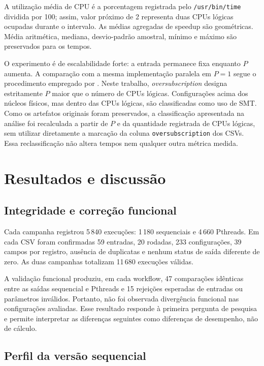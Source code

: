 \documentclass[12pt,a4paper]{article}
\begin{document}
A utilização média de CPU é a porcentagem registrada pelo
\texttt{/usr/bin/time} dividida por 100; assim, valor próximo de 2 representa
duas CPUs lógicas ocupadas durante o intervalo. As médias agregadas de speedup
são geométricas. Média aritmética, mediana, desvio-padrão amostral, mínimo e
máximo são preservados para os tempos.

O experimento é de escalabilidade forte: a entrada permanece fixa enquanto
$P$ aumenta. A comparação com a mesma implementação paralela em $P=1$ segue o
procedimento empregado por \textcite{millan2015performance}. Neste trabalho,
\textit{oversubscription} designa estritamente $P$ maior que o número de CPUs
lógicas. Configurações acima dos núcleos físicos, mas dentro das CPUs lógicas,
são classificadas como uso de SMT. Como os artefatos originais foram preservados,
a classificação apresentada na análise foi recalculada a partir de $P$ e da
quantidade registrada de CPUs lógicas, sem utilizar diretamente a marcação da
coluna \texttt{oversubscription} dos CSVs. Essa reclassificação não altera
tempos nem qualquer outra métrica medida.

\section{Resultados e discussão}

\subsection{Integridade e correção funcional}

Cada campanha registrou 5\,840 execuções: 1\,180 sequenciais e 4\,660 Pthreads. Em
cada CSV foram confirmadas 59 entradas, 20 rodadas, 233 configurações, 39 campos
por registro, ausência de duplicatas e nenhum status de saída diferente de
zero. As duas campanhas totalizam 11\,680 execuções válidas.

A validação funcional produziu, em cada workflow, 47 comparações idênticas entre
as saídas sequencial e Pthreads e 15 rejeições esperadas de entradas ou
parâmetros inválidos. Portanto, não foi observada divergência funcional nas
configurações avaliadas. Esse resultado responde à primeira pergunta de
pesquisa e permite interpretar as diferenças seguintes como diferenças de
desempenho, não de cálculo.

\subsection{Perfil da versão sequencial}
\end{document}
